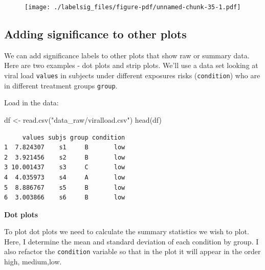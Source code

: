 \documentclass[
  letterpaper,
  DIV=11,
  numbers=noendperiod]{scrreprt}
\newenvironment{Shaded}{\begin{snugshade}}{\end{snugshade}}
\newcommand{\AttributeTok}[1]{\textcolor[rgb]{0.40,0.45,0.13}{#1}}
\newcommand{\FunctionTok}[1]{\textcolor[rgb]{0.28,0.35,0.67}{#1}}
\newcommand{\NormalTok}[1]{\textcolor[rgb]{0.00,0.23,0.31}{#1}}
\newcommand{\OtherTok}[1]{\textcolor[rgb]{0.00,0.23,0.31}{#1}}
\newcommand{\SpecialCharTok}[1]{\textcolor[rgb]{0.37,0.37,0.37}{#1}}
\newcommand{\StringTok}[1]{\textcolor[rgb]{0.13,0.47,0.30}{#1}}
\begin{document}
\begin{figure}[H]

{\centering \texttt{[image: ./labelsig\_files/figure-pdf/unnamed-chunk-35-1.pdf]}

}

\end{figure}

\hypertarget{adding-significance-to-other-plots}{%
\subsection{Adding significance to other
plots}\label{adding-significance-to-other-plots}}

We can add significance labels to other plots that show raw or summary
data. Here are two examples - dot plots and strip plots. We'll use a
data set looking at viral load \texttt{values} in subjects under
different exposures risks (\texttt{condition}) who are in different
treatment groups \texttt{group}.

Load in the data:

\begin{Shaded}
\begin{Highlighting}[]
\NormalTok{df }\OtherTok{\textless{}{-}} \FunctionTok{read.csv}\NormalTok{(}\StringTok{"data\_raw/viralload.csv"}\NormalTok{)}
\FunctionTok{head}\NormalTok{(df)}
\end{Highlighting}
\end{Shaded}

\begin{verbatim}
     values subjs group condition
1  7.824307    s1     B       low
2  3.921456    s2     B       low
3 10.001437    s3     C       low
4  4.035973    s4     A       low
5  8.886767    s5     B       low
6  3.003866    s6     B       low
\end{verbatim}

\textbf{Dot plots}

To plot dot plots we need to calculate the summary statistics we wish to
plot. Here, I determine the mean and standard deviation of each
condition by group. I also refactor the \texttt{condition} variable so
that in the plot it will appear in the order high, medium,low.

\begin{Shaded}
\end{Shaded}
\end{document}
